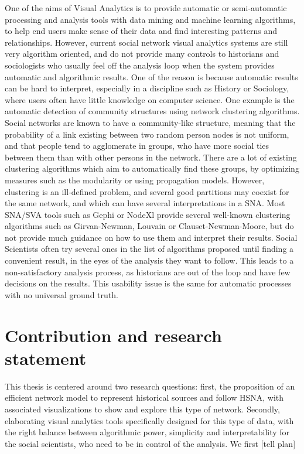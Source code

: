 One of the aims of Visual Analytics is to provide automatic or semi-automatic processing and analysis tools with data mining and machine learning algorithms, to help end users make sense of their data and find interesting patterns and relationships.
However, current social network visual analytics systems are still very algorithm oriented, and do not provide many controls to historians and sociologists who usually feel off the analysis loop when the system provides automatic and algorithmic results. One of the reason is because automatic results can be hard to interpret, especially in a discipline such as History or Sociology, where users often have little knowledge on computer science.
One example is the automatic detection of community structures using network clustering algorithms. Social networks are known to have a community-like structure, meaning that the probability of a link existing between two random person nodes is not uniform, and that people tend to agglomerate in groups, who have more social ties between them than with other persons in the network.
There are a lot of existing clustering algorithms which aim to automatically find these groups, by optimizing measures such as the modularity or using propagation models.
However, clustering is an ill-defined problem, and several good partitions may coexist for the same network, and which can have several interpretations in a SNA. Most SNA/SVA tools such as Gephi or NodeXl provide several well-known clustering algorithms such as Girvan-Newman, Louvain or Clauset-Newman-Moore, but do not provide much guidance on how to use them and interpret their results.
Social Scientists often try several ones in the list of algorithms proposed until finding a convenient result, in the eyes of the analysis they want to follow.
This leads to a non-satisfactory analysis process, as historians are out of the loop and have few decisions on the results. This usability issue is the same for automatic processes with no universal ground truth.

\section{Contribution and research statement}

This thesis is centered around two research questions: first, the proposition of an efficient network model to represent historical sources and follow HSNA, with associated visualizations to show and explore this type of network. Secondly, elaborating visual analytics tools specifically designed for this type of data, with the right balance between algorithmic power, simplicity and interpretability for the social scientists, who need to be in control of the analysis. We first [tell plan]
